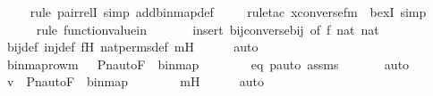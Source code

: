 \begin{isabellebody}
\ \ \ \ \isamarkupfalse%
{\isacharparenleft}{\kern0pt}rule\ pair{\isacharunderscore}{\kern0pt}relI{\isacharcomma}{\kern0pt}\ simp\ add{\isacharcolon}{\kern0pt}binmap{\isacharprime}{\kern0pt}{\isacharunderscore}{\kern0pt}def{\isacharparenright}{\kern0pt}\isanewline
\ \ \ \ \isamarkupfalse%
{\isacharparenleft}{\kern0pt}rule{\isacharunderscore}{\kern0pt}tac\ x{\isacharequal}{\kern0pt}{\isachardoublequoteopen}converse{\isacharparenleft}{\kern0pt}f{\isacharparenright}{\kern0pt}{\isacharbackquote}{\kern0pt}m{\isachardoublequoteclose}\ \ bexI{\isacharcomma}{\kern0pt}\ simp{\isacharparenright}{\kern0pt}\isanewline
\ \ \ \ \ \isamarkupfalse%
{\isacharparenleft}{\kern0pt}rule\ function{\isacharunderscore}{\kern0pt}value{\isacharunderscore}{\kern0pt}in{\isacharparenright}{\kern0pt}\isanewline
\ \ \ \ \ \ \isamarkupfalse%
{\isacharparenleft}{\kern0pt}insert\ bij{\isacharunderscore}{\kern0pt}converse{\isacharunderscore}{\kern0pt}bij\ {\isacharbrackleft}{\kern0pt}of\ f\ nat\ nat{\isacharbrackright}{\kern0pt}{\isacharparenright}{\kern0pt}\isanewline
\ \ \ \ \isamarkupfalse%
\ bij{\isacharunderscore}{\kern0pt}def\ inj{\isacharunderscore}{\kern0pt}def\ fH\ nat{\isacharunderscore}{\kern0pt}perms{\isacharunderscore}{\kern0pt}def\ mH\isanewline
\ \ \ \ \isamarkupfalse%
\ auto\isanewline
\ \ \isamarkupfalse%
\ \isamarkupfalse%
\ {\isachardoublequoteopen}{\isacharless}{\kern0pt}binmap{\isacharunderscore}{\kern0pt}row{\isacharprime}{\kern0pt}{\isacharparenleft}{\kern0pt}m{\isacharparenright}{\kern0pt}{\isacharcomma}{\kern0pt}\ {}{\isachargreater}{\kern0pt}\ {\isasymin}\ Pn{\isacharunderscore}{\kern0pt}auto{\isacharparenleft}{\kern0pt}F{\isacharparenright}{\kern0pt}\ {\isacharbackquote}{\kern0pt}\ binmap{\isacharprime}{\kern0pt}{\isachardoublequoteclose}\ \ \isanewline
\ \ \ \ \isamarkupfalse%
\ eq\ pauto{\isacharunderscore}{\kern0pt}{}\ assms\ \isanewline
\ \ \ \ \isamarkupfalse%
\ auto\isanewline
\ \ \isamarkupfalse%
\ \isamarkupfalse%
\ {\isachardoublequoteopen}v\ {\isasymin}\ Pn{\isacharunderscore}{\kern0pt}auto{\isacharparenleft}{\kern0pt}F{\isacharparenright}{\kern0pt}\ {\isacharbackquote}{\kern0pt}\ binmap{\isacharprime}{\kern0pt}{\isachardoublequoteclose}\ \ \isanewline
\ \ \ \ \isamarkupfalse%
\ mH\isanewline
\ \ \ \ \isamarkupfalse%
\ auto\isanewline
{}\isamarkupfalse%
%
\endisatagproof

\end{isabellebody}
